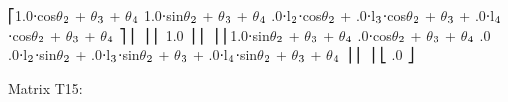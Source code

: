 \documentclass[letterpaper,10pt,english,openany,oneside]{sphinxmanual}
\begin{document}
\begin{sphinxVerbatim}[commandchars=\\\{\}]
⎡1.0⋅cos\(\theta\)\(\sb{\text{2}}\) + \(\theta\)\(\sb{\text{3}}\) + \(\theta\)\(\sb{\text{4}}\)  \PYGZhy{}1.0⋅sin\(\theta\)\(\sb{\text{2}}\) + \(\theta\)\(\sb{\text{3}}\) + \(\theta\)\(\sb{\text{4}}\)       .0⋅l\(\sb{\text{2}}\)⋅cos\(\theta\)\(\sb{\text{2}}\) + .0⋅l\(\sb{\text{3}}\)⋅cos\(\theta\)\(\sb{\text{2}}\) + \(\theta\)\(\sb{\text{3}}\) + .0⋅l\(\sb{\text{4}}\)⋅cos\(\theta\)\(\sb{\text{2}}\) + \(\theta\)\(\sb{\text{3}}\) + \(\theta\)\(\sb{\text{4}}\)    ⎤
⎢                                                                                                                    ⎥
⎢                                             \PYGZhy{}1.0                                                                ⎥
⎢                                                                                                                    ⎥
⎢1.0⋅sin\(\theta\)\(\sb{\text{2}}\) + \(\theta\)\(\sb{\text{3}}\) + \(\theta\)\(\sb{\text{4}}\)  .0⋅cos\(\theta\)\(\sb{\text{2}}\) + \(\theta\)\(\sb{\text{3}}\) + \(\theta\)\(\sb{\text{4}}\)   .0   .0⋅l\(\sb{\text{2}}\)⋅sin\(\theta\)\(\sb{\text{2}}\) + .0⋅l\(\sb{\text{3}}\)⋅sin\(\theta\)\(\sb{\text{2}}\) + \(\theta\)\(\sb{\text{3}}\) + .0⋅l\(\sb{\text{4}}\)⋅sin\(\theta\)\(\sb{\text{2}}\) + \(\theta\)\(\sb{\text{3}}\) + \(\theta\)\(\sb{\text{4}}\)    ⎥
⎢                                                                                                                    ⎥
⎣                                                                                .0                              ⎦


Matrix T\PYGZus{}1\PYGZus{}5:    


\end{sphinxVerbatim}
\end{document}
